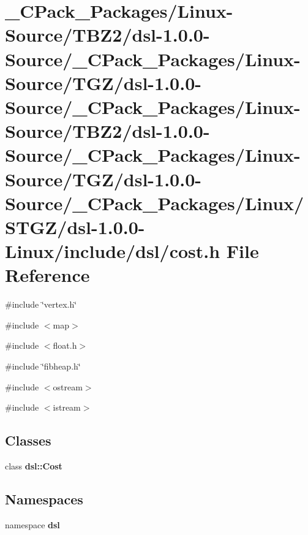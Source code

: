 \section{\_\-CPack\_\-Packages/Linux-\/Source/TBZ2/dsl-\/1.0.0-\/Source/\_\-CPack\_\-Packages/Linux-\/Source/TGZ/dsl-\/1.0.0-\/Source/\_\-CPack\_\-Packages/Linux-\/Source/TBZ2/dsl-\/1.0.0-\/Source/\_\-CPack\_\-Packages/Linux-\/Source/TGZ/dsl-\/1.0.0-\/Source/\_\-CPack\_\-Packages/Linux/STGZ/dsl-\/1.0.0-\/Linux/include/dsl/cost.h File Reference}
\label{__CPack__Packages_2Linux-Source_2TBZ2_2dsl-1_80_80-Source_2__CPack__Packages_2Linux-Source_2TGZ_63378033cf8adf9ecc8d4b7333e427d6}
{\ttfamily \#include \char`\"{}vertex.h\char`\"{}}\par
{\ttfamily \#include $<$map$>$}\par
{\ttfamily \#include $<$float.h$>$}\par
{\ttfamily \#include \char`\"{}fibheap.h\char`\"{}}\par
{\ttfamily \#include $<$ostream$>$}\par
{\ttfamily \#include $<$istream$>$}\par
\subsection*{Classes}
\begin{DoxyCompactItemize}
\item 
class {\bf dsl::Cost}
\end{DoxyCompactItemize}
\subsection*{Namespaces}
\begin{DoxyCompactItemize}
\item 
namespace {\bf dsl}
\end{DoxyCompactItemize}
